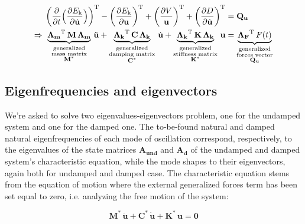 \documentclass[a4paper,12pt,oneside]{article}
\begin{document}
\begin{align}
\label{eqn:motion}
	\biggl(\frac{\partial}{\partial t}
		\Bigl(\frac{\partial E_\textup{k}}
		{\partial \dot{\mathbf{u}}}\Bigr)\biggr)^\textup{T} -
		\biggl(\frac{\partial E_\textup{k}}{\partial \mathbf{u}}\biggr)^\textup{T} +
		\biggl(\frac{\partial V}{\mathbf{u}}\biggr)^\textup{T} +
		\biggl(\frac{\partial D}{\partial \dot{\mathbf{u}}}\biggr)^\textup{T} & =
		\mathbf{Q_u} \notag \\
	\Rightarrow ~
		\underbrace{\mathbf{\Lambda_m}^\textup{T} \, \mathbf{M} \, \mathbf{\Lambda_m}}_
		{\substack{\text{generalized} \\ \text{mass matrix} \\
		\text{$ \mathbf{M^*} $}}} \, \ddot{\mathbf{u}} +
		\underbrace{\mathbf{\Lambda_k}^\textup{T} \, \mathbf{C} \,	\mathbf{\Lambda_k}}_
		{\substack{\text{generalized} \\ \text{damping matrix} \\
		\text{$ \mathbf{C^*} $}}} \, \dot{\mathbf{u}} +
		\underbrace{\mathbf{\Lambda_k}^\textup{T} \, \mathbf{K} \, \mathbf{\Lambda_k}}_
		{\substack{\text{generalized} \\ \text{stiffness matrix} \\
		\text{$ \mathbf{K^*} $}}} \, \mathbf{u} & =
		\underbrace{\mathbf{\Lambda_F}^\textup{T} \, F(t)}_
		{\substack{\text{generalized} \\ \text{forces vector} \\
		\text{$ \mathbf{Q_u} $}}}
\end{align}

\subsection{Eigenfrequencies and eigenvectors}

We're asked to solve two eigenvalues-eigenvectors problem, one for the undamped system and one for the damped one. The to-be-found natural and damped natural eigenfrequencies of each mode of oscillation correspond, respectively, to the eigenvalues of the state matrices $ \mathbf{A_{und}} $ and $ \mathbf{A_d} $ of the undamped and damped system's characteristic equation, while the mode shapes to their eigenvectors, again both for undamped and damped case. The characteristic equation stems from the equation of motion where the external generalized forces term has been set equal to zero, i.e. analyzing the free motion of the system:

\[
	\mathbf{M^*} \, \ddot{\mathbf{u}} + \mathbf{C^*} \, \dot{\mathbf{u}} +
		\mathbf{K^*} \, \mathbf{u} = \mathbf{0}
\]
\end{document}

